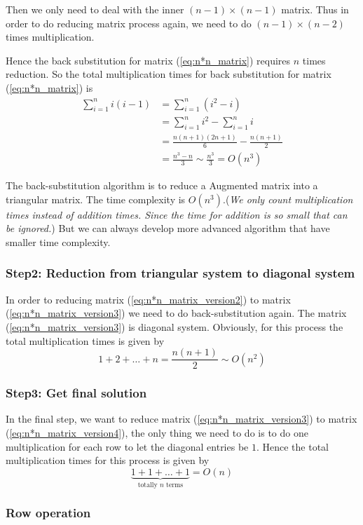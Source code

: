Then we only need to deal with the inner $(n-1)\times (n-1)$ matrix. Thus in order to do reducing matrix process again, we need to do $(n-1)\times (n-2)$ times multiplication.

Hence the back substitution for matrix (\ref{eq:n*n_matrix}) requires $n$ times reduction. So the total multiplication times for back substitution for matrix (\ref{eq:n*n_matrix}) is
\begin{equation*}
\begin{split}
\sum_{i=1}^n i(i-1)
	&= \sum_{i=1}^n (i^2-i)  \\
 		&=\sum_{i=1}^n i^2 - \sum_{i=1}^n i \\
		&=\frac{n(n+1)(2n+1)}{6} - \frac{n(n+1)}{2} \\
		&=\frac{n^3-n}{3} \sim \frac{n^3}{3} =O(n^3)
\end{split}
\end{equation*}

The back-substitution algorithm is to reduce a Augmented matrix into a triangular matrix. The time complexity is $O(n^3)$.(\textit{We only count multiplication times instead of addition times. Since the time for addition is so small that can be ignored.}) But we can always develop more advanced algorithm that have smaller time complexity.
\subsubsection{Step2: Reduction from triangular system to diagonal system}

In order to reducing matrix (\ref{eq:n*n_matrix_version2}) to matrix (\ref{eq:n*n_matrix_version3}) we need to do back-substitution again. The matrix (\ref{eq:n*n_matrix_version3}) is diagonal system. Obviously, for this process the total multiplication times is given by
\[
1+2+\dots+n = \frac{n(n+1)}{2} \sim O(n^2)
\]
\subsubsection{Step3: Get final solution}

In the final step, we want to reduce matrix (\ref{eq:n*n_matrix_version3}) to matrix (\ref{eq:n*n_matrix_version4}), the only thing we need to do is to do one multiplication for each row to let the diagonal entries be $1$. Hence the total multiplication times for this process is given by
\[
\underbrace{1+1+\dots+1}_{\text{totally $n$ terms}} = O(n)
\]
\subsubsection{Row operation}

